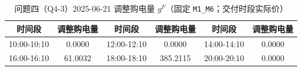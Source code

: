 \begin{table}[htbp]
\centering
\caption{问题四（Q4-3）2025-06-21 调整购电量 $g^F$（固定 \texttt{M1\_M6}；交付时段实际价）}\label{tab:q4-3-adjust}
\normalsize\setlength{\tabcolsep}{5pt}
\begin{tabular}{@{}cccccc@{}}
\toprule
时间段 & 调整购电量 & 时间段 & 调整购电量 & 时间段 & 调整购电量 \\
\midrule
10:00-10:10 & 0.0000 & 12:00-12:10 & 0.0000 & 14:00-14:10 & 0.0000 \\
16:00-16:10 & 61.0032 & 18:00-18:10 & 385.2115 & 20:00-20:10 & 0.0000 \\
\bottomrule
\end{tabular}
\end{table}
